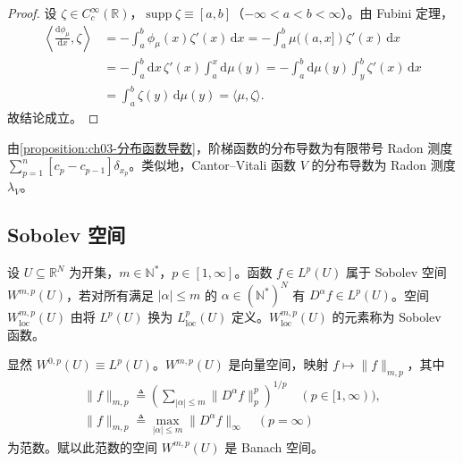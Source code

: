 \documentclass[../../main.tex]{subfiles}%
\begin{document}
\begin{proof}
设 $\zeta\in C^\infty_c(\mathbb{R})$，$\operatorname{supp}\zeta\equiv[a,b]$（$-\infty<a<b<\infty$）。由 Fubini 定理，
\begin{align*}
\left\langle\frac{\mathrm{d}\phi_\mu}{\mathrm{d}x},\zeta\right\rangle
&=-\int_a^b\phi_\mu(x)\zeta'(x)\,\mathrm{d}x
=-\int_a^b\mu((a,x])\zeta'(x)\,\mathrm{d}x\\
&=-\int_a^b\mathrm{d}x\,\zeta'(x)\int_a^x\mathrm{d}\mu(y)
=-\int_a^b\mathrm{d}\mu(y)\int_y^b\zeta'(x)\,\mathrm{d}x\\
&=\int_a^b\zeta(y)\,\mathrm{d}\mu(y)=\langle\mu,\zeta\rangle.
\end{align*}
故结论成立。
\end{proof}

\begin{remark}\label{remark:ch03-阶梯函数导数}
由\cref{proposition:ch03-分布函数导数}，阶梯函数的分布导数为有限带号 Radon 测度 $\sum_{p=1}^n[c_p-c_{p-1}]\delta_{x_p}$。类似地，Cantor--Vitali 函数 $V$ 的分布导数为 Radon 测度 $\lambda_V$。
\end{remark}

\subsection{Sobolev 空间}\label{subsection:ch03-Sobolev空间}

\begin{definition}\label{definition:ch03-Sobolev空间定义}\label{subsection:ch03-Sobolev定义}
设 $U\subseteq\mathbb{R}^N$ 为开集，$m\in\mathbb{N}^*$，$p\in[1,\infty]$。函数 $f\in L^p(U)$ 属于 Sobolev 空间 $W^{m,p}(U)$，若对所有满足 $|\alpha|\leqslant m$ 的 $\alpha\in(\mathbb{N}^*)^N$ 有 $D^\alpha f\in L^p(U)$。空间 $W^{m,p}_{\mathrm{loc}}(U)$ 由将 $L^p(U)$ 换为 $L^p_{\mathrm{loc}}(U)$ 定义。$W^{m,p}_{\mathrm{loc}}(U)$ 的元素称为 Sobolev 函数。
\end{definition}

显然 $W^{0,p}(U)\equiv L^p(U)$。$W^{m,p}(U)$ 是向量空间，映射 $f\mapsto\|f\|_{m,p}$，其中
\begin{align}
\|f\|_{m,p}\triangleq \left(\sum_{|\alpha|\leqslant m}\|D^\alpha f\|_p^p\right)^{1/p}
\quad (p\in[1,\infty)),\label{align:ch03-3.2a}\\
\|f\|_{m,p}\triangleq \max_{|\alpha|\leqslant m}\|D^\alpha f\|_\infty
\quad (p=\infty)\label{align:ch03-3.2b}
\end{align}
为范数。赋以此范数的空间 $W^{m,p}(U)$ 是 Banach 空间。
\end{document}

